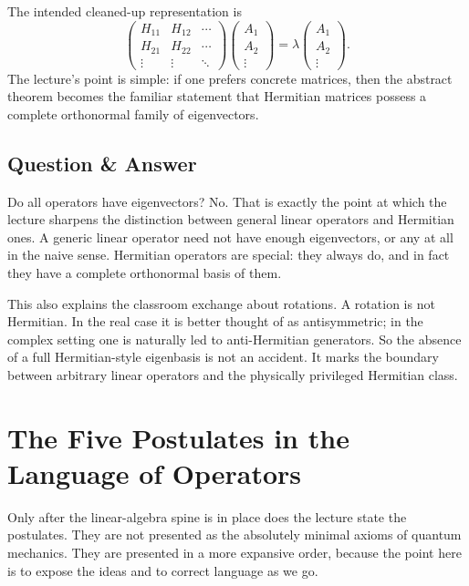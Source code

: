 The intended cleaned-up representation is
\begin{equation}
\begin{pmatrix}
H_{11} & H_{12} & \cdots \\
H_{21} & H_{22} & \cdots \\
\vdots & \vdots & \ddots
\end{pmatrix}
\begin{pmatrix}
A_1 \\ A_2 \\ \vdots
\end{pmatrix}
=
\lambda
\begin{pmatrix}
A_1 \\ A_2 \\ \vdots
\end{pmatrix}.
\end{equation}
The lecture's point is simple: if one prefers concrete matrices, then the abstract theorem becomes the familiar statement that Hermitian matrices possess a complete orthonormal family of eigenvectors.

\subsection{Question \& Answer}

Do all operators have eigenvectors? No. That is exactly the point at which the lecture sharpens the distinction between general linear operators and Hermitian ones. A generic linear operator need not have enough eigenvectors, or any at all in the naive sense. Hermitian operators are special: they always do, and in fact they have a complete orthonormal basis of them.

This also explains the classroom exchange about rotations. A rotation is not Hermitian. In the real case it is better thought of as antisymmetric; in the complex setting one is naturally led to anti-Hermitian generators. So the absence of a full Hermitian-style eigenbasis is not an accident. It marks the boundary between arbitrary linear operators and the physically privileged Hermitian class.

\section{The Five Postulates in the Language of Operators}

Only after the linear-algebra spine is in place does the lecture state the postulates. They are not presented as the absolutely minimal axioms of quantum mechanics. They are presented in a more expansive order, because the point here is to expose the ideas and to correct language as we go.


